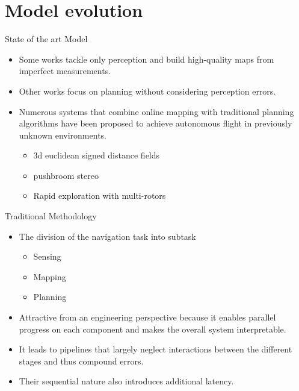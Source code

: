 \documentclass{beamer}
\begin{document}
\section{Model evolution}
\begin{frame}{State of the art Model}
	\begin{itemize}
		\item Some works tackle only perception and build high-quality maps from imperfect measurements. 
		\item Other works focus on planning without considering perception errors. 
		\item Numerous systems that combine online mapping with traditional planning algorithms have been proposed to achieve autonomous flight in previously unknown environments.
		\begin{itemize}
			\item 3d euclidean signed distance fields
			\item pushbroom stereo
			\item Rapid exploration
with multi-rotors
		\end{itemize} 
	\end{itemize}
\end{frame}

\begin{frame}{Traditional Methodology}
	\begin{itemize}
		\item The division of the navigation task into subtask
		\begin{itemize}
			\item Sensing
			\item Mapping
			\item Planning	
		\end{itemize} 
	
		\item Attractive from an engineering perspective because it enables parallel progress on each component and makes the overall system interpretable. 
		\item It leads to pipelines that largely neglect interactions between the different stages and thus compound errors. 
		\item Their sequential nature also introduces additional latency.
	\end{itemize}
\end{frame}
\end{document}
